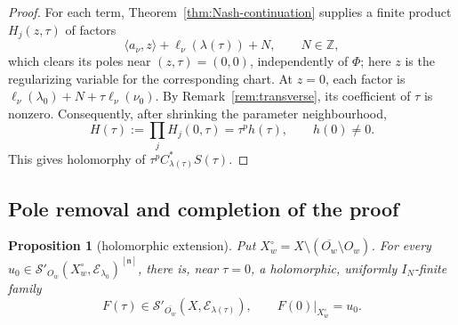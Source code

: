 \documentclass[a4paper,12pt]{amsart}
\numberwithin{equation}{section}
\newtheorem{proposition}[theorem]{Proposition}
\theoremstyle{definition}
\theoremstyle{remark}
\newcommand{\fn}{\mathfrak n}
\newcommand{\IN}{I_N}
\newcommand{\mcS}{\mathcal S}
\newcommand{\mcE}{\mathcal E}
\begin{document}
\begin{proof}
For each term, Theorem~\ref{thm:Nash-continuation} supplies a finite product $H_j(z,\tau)$ of factors
\[
 \langle a_\nu,z\rangle+\ell_\nu(\lambda(\tau))+N,
 \qquad N\in\mathbb Z,
\]
which clears its poles near $(z,\tau)=(0,0)$, independently of $\Phi$; here $z$ is the regularizing variable for the corresponding chart. At $z=0$, each factor is $\ell_\nu(\lambda_0)+N+\tau\ell_\nu(\nu_0)$. By Remark~\ref{rem:transverse}, its coefficient of $\tau$ is nonzero. Consequently, after shrinking the parameter neighbourhood,
\[
 H(\tau):=\prod_jH_j(0,\tau)=\tau^p h(\tau),
 \qquad h(0)\ne0.
\]
This gives holomorphy of $\tau^pC_{\lambda(\tau)}^*S(\tau)$.
\end{proof}

\subsection{Pole removal and completion of the proof}\label{ssec:pole-removal}

\begin{proposition}[holomorphic extension]\label{prop:holomorphic-extension}
Put $X_w^\circ=X\setminus(\overline{O_w}\setminus O_w)$. For every $u_0\in\mcS'_{O_w}(X_w^\circ,\mcE_{\lambda_0})^{[\fn]}$, there is, near $\tau=0$, a holomorphic, uniformly $\IN$-finite family
\[
 F(\tau)\in\mcS'_{\overline{O_w}}(X,\mcE_{\lambda(\tau)}),
 \qquad F(0)|_{X_w^\circ}=u_0.
\]
\end{proposition}
\end{document}
